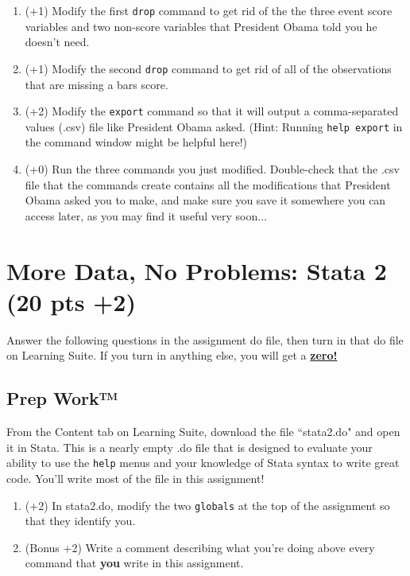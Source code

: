 \documentclass[12pt, oneside]{article}
\begin{document}
\begin{enumerate}
\begin{enumerate}
    \item (+1) Modify the first \texttt{drop} command to get rid of the the three event score variables and two non-score variables that President Obama told you he doesn't need.
    \item (+1) Modify the second \texttt{drop} command to get rid of all of the observations that are missing a bars score.
    \item (+2) Modify the \texttt{export} command so that it will output a comma-separated values (.csv) file like President Obama asked. (Hint: Running \texttt{help export} in the command window might be helpful here!)
    \item (+0) Run the three commands you just modified. Double-check that the .csv file that the commands create contains all the modifications that President Obama asked you to make, and make sure you save it somewhere you can access later, as you may find it useful very soon...
\end{enumerate}
\end{enumerate}


\newpage
\section{More Data, No Problems: Stata 2 (20 pts +2)}
Answer the following questions in the assignment do file, then turn in that do file on Learning Suite. If you turn in anything else, you will get a \underline{\textbf{zero!}}

\subsection{Prep Work™}
\item   From the Content tab on Learning Suite, download the file ``stata2.do" and open it in Stata. This is a nearly empty .do file that is designed to evaluate your ability to use the \texttt{help} menus and your knowledge of Stata syntax to write great code. You'll write most of the file in this assignment!
\begin{enumerate}
\item   (+2)    In stata2.do, modify the two \texttt{globals} at the top of the assignment so that they identify you.
\item   (Bonus +2)  Write a comment describing what you're doing above every command that \textbf{you} write in this assignment.
\end{enumerate}
\end{document}
